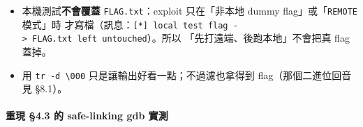 \documentclass[10pt,a4paper]{article}
\providecommand{\tightlist}{%
  \setlength{\itemsep}{0pt}\setlength{\parskip}{0pt}}
\begin{document}
\begin{itemize}
\tightlist
\item
  本機測試\textbf{不會覆蓋} \texttt{FLAG.\allowbreak{}txt}：exploit 只在「非本地
  dummy flag」或「\texttt{REMOTE} 模式」時
  才寫檔（訊息：\texttt{{[}*{]}\ \allowbreak{}local\ \allowbreak{}test\ \allowbreak{}flag\ \allowbreak{}-\allowbreak{}\textgreater{}\allowbreak{}\ \allowbreak{}FLAG.\allowbreak{}txt\ \allowbreak{}left\ \allowbreak{}untouched}）。所以
  「先打遠端、後跑本地」不會把真 flag 蓋掉。
\item
  用
  \texttt{tr\ \allowbreak{}-\allowbreak{}d\ \allowbreak{}\textquotesingle{}\allowbreak{}\textbackslash{}\allowbreak{}000\textquotesingle{}\allowbreak{}}
  只是讓輸出好看一點；不過濾也拿得到 flag（那個二進位回音見 §8.1）。
\end{itemize}

\paragraph{重現 §4.3 的 safe-linking gdb
實測}\label{ux91cdux73fe-4.3-ux7684-safe-linking-gdb-ux5be6ux6e2c}
\end{document}
